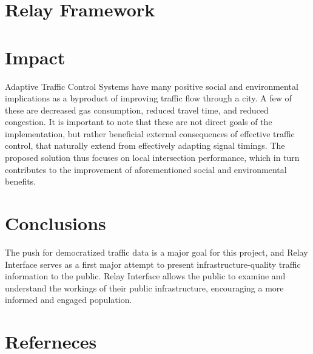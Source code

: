 \documentclass[a4paper,11pt]{report}
\begin{document}
\begin{multicols}{2}
\section{Relay Framework}

\section{Impact}
Adaptive Traffic Control Systems have many positive social and environmental implications as a byproduct of improving traffic flow through a city.
A few of these are decreased gas consumption, reduced travel time, and reduced congestion.
It is important to note that these are not direct goals of the implementation, but rather beneficial external consequences of effective traffic control, that naturally extend from effectively adapting signal timings.
The proposed solution thus focuses on local intersection performance, which in turn contributes to the improvement of aforementioned social and environmental benefits.

\section{Conclusions}

The push for democratized traffic data is a major goal for this project, and Relay Interface serves as a first major attempt to present infrastructure-quality traffic information to the public. Relay Interface allows the public to examine and understand the workings of their public infrastructure, encouraging a more informed and engaged population.

\section{Referneces}




\end{multicols}
\end{document}
